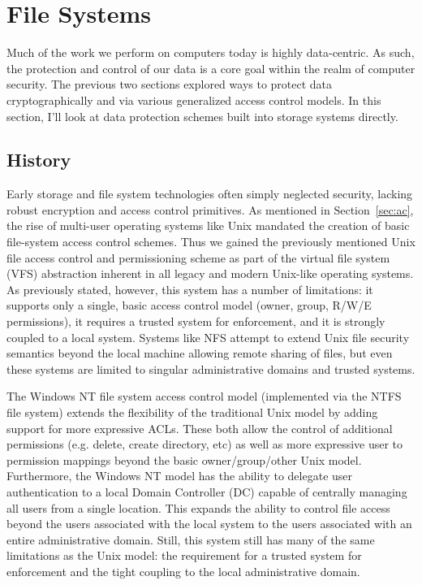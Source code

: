 \documentclass{sig-alternate}
\begin{document}
\section{File Systems}
\label{sec:fs}

Much of the work we perform on computers today is highly
data-centric. As such, the protection and control of our data is a
core goal within the realm of computer security. The previous two
sections explored ways to protect data cryptographically and via
various generalized access control models. In this section, I'll look
at data protection schemes built into storage systems directly.

\subsection{History}

Early storage and file system technologies often simply neglected
security, lacking robust encryption and access control primitives. As
mentioned in Section~\ref{sec:ac}, the rise of multi-user operating
systems like Unix mandated the creation of basic file-system access
control schemes. Thus we gained the previously mentioned Unix file
access control and permissioning scheme as part of the virtual file
system (VFS) abstraction inherent in all legacy and modern Unix-like
operating systems. As previously stated, however, this system has a
number of limitations: it supports only a single, basic access control
model (owner, group, R/W/E permissions), it requires a trusted system
for enforcement, and it is strongly coupled to a local system. Systems
like NFS attempt to extend Unix file security semantics beyond the
local machine allowing remote sharing of files, but even these systems
are limited to singular administrative domains and trusted systems.

The Windows NT file system access control model (implemented via the
NTFS file system) extends the flexibility of the traditional Unix
model by adding support for more expressive ACLs. These both allow the
control of additional permissions (e.g. delete, create directory, etc)
as well as more expressive user to permission mappings beyond the
basic owner/group/other Unix model. Furthermore, the Windows NT model
has the ability to delegate user authentication to a local Domain
Controller (DC) capable of centrally managing all users from a single
location. This expands the ability to control file access beyond the
users associated with the local system to the users associated with an
entire administrative domain. Still, this system still has many of the
same limitations as the Unix model: the requirement for a trusted
system for enforcement and the tight coupling to the local
administrative domain.
\end{document}
